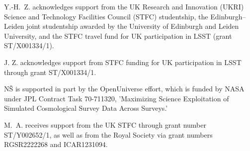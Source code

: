 \documentclass[a4paper, 11pt]{article}
\begin{document}
Y.-H.~Z. acknowledges support from the UK Research and Innovation (UKRI) Science and Technology Facilities Council (STFC) studentship, the Edinburgh--Leiden joint studentship awarded by the University of Edinburgh and Leiden University, and the STFC travel fund for UK participation in LSST (grant ST/X001334/1). 

J. Z. acknowledges support from STFC funding for UK participation in LSST through grant ST/X001334/1.

N\v{S} is supported in part by the OpenUniverse effort, which is funded by NASA under JPL Contract Task 70-711320, 'Maximizing Science Exploitation of Simulated Cosmological Survey Data Across Surveys.'

M.~A. receives support from the UK STFC through grant number ST/Y002652/1, as well as from the Royal Society via grant numbers RGSR2222268 and ICAR1231094.
\end{document}
